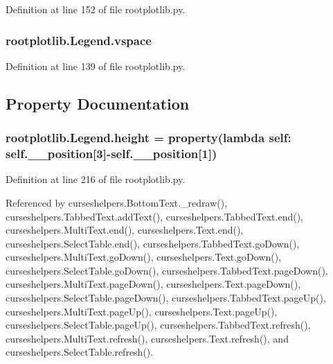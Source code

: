 Definition at line 152 of file rootplotlib.\-py.

\subsubsection[{vspace}]{\setlength{\rightskip}{0pt plus 5cm}rootplotlib.\-Legend.\-vspace}\label{classrootplotlib_1_1Legend_ac0ef0face6dd006cf217421ceaf5cc3b}


Definition at line 139 of file rootplotlib.\-py.



\subsection{Property Documentation}
\subsubsection[{height}]{\setlength{\rightskip}{0pt plus 5cm}rootplotlib.\-Legend.\-height = property(lambda self\-: self.\-\_\-\-\_\-position\mbox{[}3\mbox{]}-\/self.\-\_\-\-\_\-position\mbox{[}1\mbox{]})\hspace{0.3cm}{\ttfamily [static]}}\label{classrootplotlib_1_1Legend_a36c5048e8fc02d72a80b3ea0207d2e2b}


Definition at line 216 of file rootplotlib.\-py.



Referenced by curseshelpers.\-Bottom\-Text.\-\_\-redraw(), curseshelpers.\-Tabbed\-Text.\-add\-Text(), curseshelpers.\-Tabbed\-Text.\-end(), curseshelpers.\-Multi\-Text.\-end(), curseshelpers.\-Text.\-end(), curseshelpers.\-Select\-Table.\-end(), curseshelpers.\-Tabbed\-Text.\-go\-Down(), curseshelpers.\-Multi\-Text.\-go\-Down(), curseshelpers.\-Text.\-go\-Down(), curseshelpers.\-Select\-Table.\-go\-Down(), curseshelpers.\-Tabbed\-Text.\-page\-Down(), curseshelpers.\-Multi\-Text.\-page\-Down(), curseshelpers.\-Text.\-page\-Down(), curseshelpers.\-Select\-Table.\-page\-Down(), curseshelpers.\-Tabbed\-Text.\-page\-Up(), curseshelpers.\-Multi\-Text.\-page\-Up(), curseshelpers.\-Text.\-page\-Up(), curseshelpers.\-Select\-Table.\-page\-Up(), curseshelpers.\-Tabbed\-Text.\-refresh(), curseshelpers.\-Multi\-Text.\-refresh(), curseshelpers.\-Text.\-refresh(), and curseshelpers.\-Select\-Table.\-refresh().

